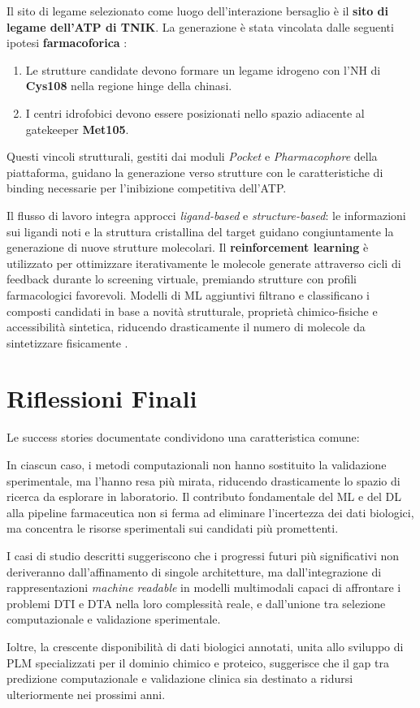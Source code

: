 Il sito di legame selezionato come luogo dell'interazione bersaglio è il 
\textbf{sito di legame dell'ATP di TNIK}.
La generazione è stata vincolata dalle seguenti ipotesi 
\textbf{farmacoforica} \cite{renSmallmoleculeTNIKInhibitor2025}: 
\begin{enumerate}
    \item Le strutture 
    candidate devono formare un legame idrogeno con 
    l'NH di \textbf{Cys108} nella regione hinge della 
    chinasi.
    \item I centri idrofobici devono essere posizionati nello spazio adiacente al gatekeeper \textbf{Met105}.
\end{enumerate}
Questi vincoli strutturali, gestiti dai moduli 
\textit{Pocket} e \textit{Pharmacophore} della 
piattaforma, guidano la generazione verso strutture 
con le caratteristiche di binding necessarie 
per l'inibizione competitiva dell'ATP. 

Il flusso di lavoro integra approcci 
\textit{ligand-based} e \textit{structure-based}: 
le informazioni sui ligandi noti e la struttura 
cristallina del target guidano congiuntamente la 
generazione di nuove strutture molecolari.
Il \textbf{reinforcement learning} è utilizzato per 
ottimizzare iterativamente le molecole generate 
attraverso cicli di feedback durante lo screening 
virtuale, premiando strutture con profili farmacologici 
favorevoli. Modelli di ML aggiuntivi filtrano e 
classificano i composti candidati in base a novità 
strutturale, proprietà chimico-fisiche e accessibilità 
sintetica, riducendo drasticamente il numero di 
molecole da sintetizzare fisicamente \cite{renSmallmoleculeTNIKInhibitor2025}.

\section{Riflessioni Finali}

Le success stories documentate condividono una 
caratteristica comune:

In ciascun caso, i metodi 
computazionali non hanno sostituito la validazione 
sperimentale, ma l'hanno resa più mirata, riducendo 
drasticamente lo spazio di ricerca da esplorare in 
laboratorio. Il contributo fondamentale del 
ML e del DL alla pipeline farmaceutica non si ferma ad eliminare 
l'incertezza dei dati biologici, ma concentra le risorse 
sperimentali sui candidati più promettenti.

I casi di studio descritti suggeriscono che i progressi 
futuri più significativi non deriveranno 
dall'affinamento di singole architetture, ma 
dall'integrazione di rappresentazioni \textit{machine readable} in modelli 
multimodali capaci di affrontare i problemi DTI e DTA
nella loro complessità reale, e dall'unione tra selezione computazionale e validazione sperimentale. 

Ioltre, la crescente 
disponibilità di dati biologici annotati, unita 
allo sviluppo di PLM specializzati per il dominio 
chimico e proteico, suggerisce che il gap tra 
predizione computazionale e validazione clinica 
sia destinato a ridursi ulteriormente nei prossimi 
anni.